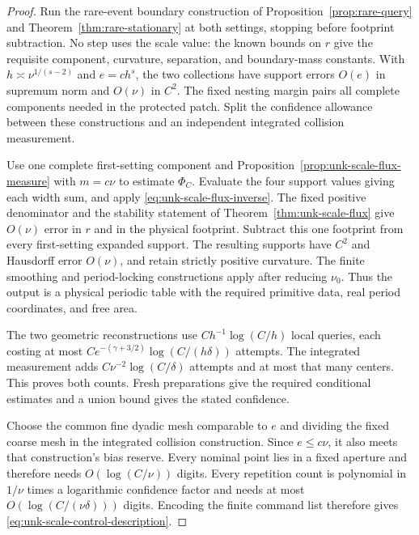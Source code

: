 \begin{proof}
Run the rare-event boundary construction of
Proposition~\ref{prop:rare-query} and
Theorem~\ref{thm:rare-stationary} at both settings, stopping before
footprint subtraction. No step uses the scale value: the known
bounds on $r$ give the requisite component, curvature, separation,
and boundary-mass constants. With
$h\asymp\nu^{1/(s-2)}$ and $e=c h^s$, the two collections have
support errors $O(e)$ in supremum norm and $O(\nu)$ in $C^2$.
The fixed nesting margin pairs all complete components needed in
the protected patch. Split the confidence allowance between these
constructions and an independent integrated collision measurement.

Use one complete first-setting component and
Proposition~\ref{prop:unk-scale-flux-measure} with $m=c\nu$ to
estimate $\Phi_C$. Evaluate the four support values giving each
width sum, and apply \eqref{eq:unk-scale-flux-inverse}. The fixed
positive denominator and the stability statement of
Theorem~\ref{thm:unk-scale-flux} give $O(\nu)$ error in $r$ and
in the physical footprint. Subtract this one footprint from
every first-setting expanded support. The resulting supports have
$C^2$ and Hausdorff error $O(\nu)$, and retain strictly positive
curvature. The finite smoothing and period-locking constructions
apply after reducing $\nu_0$. Thus the output is a physical periodic
table with the required primitive data, real period coordinates,
and free area.

The two geometric reconstructions use
$C h^{-1}\log(C/h)$ local queries, each costing at most
$C e^{-(\gamma+3/2)}\log(C/(h\delta))$ attempts. The integrated
measurement adds $C\nu^{-2}\log(C/\delta)$ attempts and at most
that many centers. This proves both counts. Fresh preparations
give the required conditional estimates and a union bound gives
the stated confidence.

Choose the common fine dyadic mesh comparable to $e$ and dividing
the fixed coarse mesh in the integrated collision construction. Since $e\le c\nu$,
it also meets that construction's bias reserve. Every nominal point
lies in a fixed aperture and therefore needs $O(\log(C/\nu))$
digits. Every repetition count is polynomial in $1/\nu$ times a
logarithmic confidence factor and needs at most
$O(\log(C/(\nu\delta)))$ digits. Encoding the finite command list
therefore gives \eqref{eq:unk-scale-control-description}.
\end{proof}

